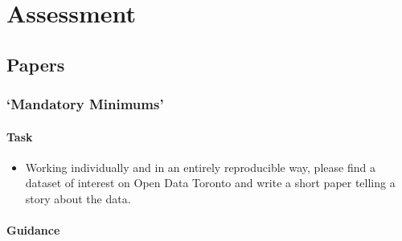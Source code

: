 \documentclass[
]{book}
\providecommand{\tightlist}{%
  \setlength{\itemsep}{0pt}\setlength{\parskip}{0pt}}
\begin{document}
\hypertarget{part-assessment}{%
\part{Assessment}\label{part-assessment}}

\hypertarget{papers}{%
\chapter{Papers}\label{papers}}

\hypertarget{mandatory-minimums}{%
\section{`Mandatory Minimums'}\label{mandatory-minimums}}

\hypertarget{task}{%
\subsection{Task}\label{task}}

\begin{itemize}
\tightlist
\item
  Working individually and in an entirely reproducible way, please find a dataset of interest on Open Data Toronto and write a short paper telling a story about the data.
\end{itemize}

\hypertarget{guidance}{%
\subsection{Guidance}\label{guidance}}
\end{document}
